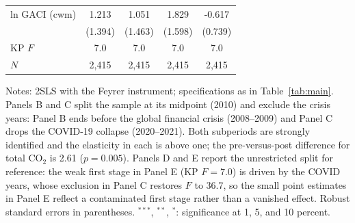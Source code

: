 \documentclass[12pt]{article}
\begin{document}
\begin{table}[htbp]
\begin{threeparttable}
\begin{tabular}{lcccc}
  ln GACI (cwm) & 1.213 & 1.051 & 1.829 & -0.617 \\
   & (1.394) & (1.463) & (1.598) & (0.739) \\
  KP $F$ & 7.0 & 7.0 & 7.0 & 7.0 \\
  $N$ & 2,415 & 2,415 & 2,415 & 2,415 \\
\bottomrule
\end{tabular}
\begin{tablenotes}[flushleft]
\footnotesize
\item Notes: 2SLS with the Feyrer instrument; specifications as in Table~\ref{tab:main}. Panels B and C split the sample at its midpoint (2010) and exclude the crisis years: Panel B ends before the global financial crisis (2008--2009) and Panel C drops the COVID-19 collapse (2020--2021). Both subperiods are strongly identified and the elasticity in each is above one; the pre-versus-post difference for total CO$_2$ is 2.61 ($p = 0.005$). Panels D and E report the unrestricted split for reference: the weak first stage in Panel E (KP $F = 7.0$) is driven by the COVID years, whose exclusion in Panel C restores $F$ to 36.7, so the small point estimates in Panel E reflect a contaminated first stage rather than a vanished effect. Robust standard errors in parentheses. $^{***}$, $^{**}$, $^{*}$: significance at 1, 5, and 10 percent.
\end{tablenotes}
\end{threeparttable}
\end{table}
\end{document}
